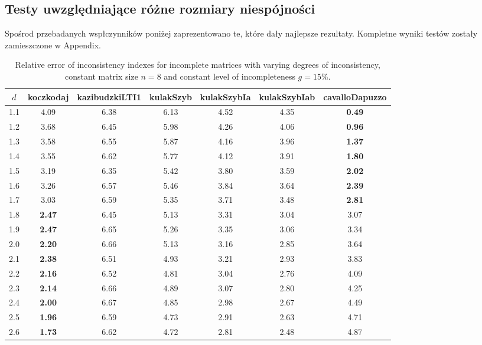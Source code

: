 \subsection{Testy uwzględniające różne rozmiary niespójności}
Spośrod przebadanych wspłczynników poniżej zaprezentowano te, które dały najlepsze rezultaty. Kompletne wyniki testów zostały zamieszczone w Appendix.
\begin{table}[!ht]
\begin{center}
\caption{Relative error of inconsistency indexes for incomplete matrices with varying degrees of inconsistency, constant matrix size $n=8$ and constant level of incompleteness $g=15\%$.}
\label{tab:results1}
\begin{tabular}{|c||c|c|c|c|c|c|}
\hline $d$ & koczkodaj & kazibudzkiLTI1 & kulakSzyb & kulakSzybIa & kulakSzybIab & cavalloDapuzzo  \\ \hline \hline
1.1 & 4.09 & 6.38 & 6.13 & 4.52 & 4.35 & \textbf{0.49} \\ \hline
1.2 & 3.68 & 6.45 & 5.98 & 4.26 & 4.06 & \textbf{0.96} \\ \hline
1.3 & 3.58 & 6.55 & 5.87 & 4.16 & 3.96 & \textbf{1.37} \\ \hline
1.4 & 3.55 & 6.62 & 5.77 & 4.12 & 3.91 & \textbf{1.80} \\ \hline
1.5 & 3.19 & 6.35 & 5.42 & 3.80 & 3.59 & \textbf{2.02} \\ \hline
1.6 & 3.26 & 6.57 & 5.46 & 3.84 & 3.64 & \textbf{2.39} \\ \hline
1.7 & 3.03 & 6.59 & 5.35 & 3.71 & 3.48 & \textbf{2.81} \\ \hline
1.8 & \textbf{2.47} & 6.45 & 5.13 & 3.31 & 3.04 & 3.07 \\ \hline
1.9 & \textbf{2.47} & 6.65 & 5.26 & 3.35 & 3.06 & 3.34 \\ \hline
2.0 & \textbf{2.20} & 6.66 & 5.13 & 3.16 & 2.85 & 3.64 \\ \hline
2.1 & \textbf{2.38} & 6.51 & 4.93 & 3.21 & 2.93 & 3.83 \\ \hline
2.2 & \textbf{2.16} & 6.52 & 4.81 & 3.04 & 2.76 & 4.09 \\ \hline
2.3 & \textbf{2.14} & 6.66 & 4.89 & 3.07 & 2.80 & 4.25 \\ \hline
2.4 & \textbf{2.00} & 6.67 & 4.85 & 2.98 & 2.67 & 4.49 \\ \hline
2.5 & \textbf{1.96} & 6.59 & 4.73 & 2.91 & 2.63 & 4.71 \\ \hline
2.6 & \textbf{1.73} & 6.62 & 4.72 & 2.81 & 2.48 & 4.87 \\ \hline

\end{tabular}
\end{center}
\end{table}
